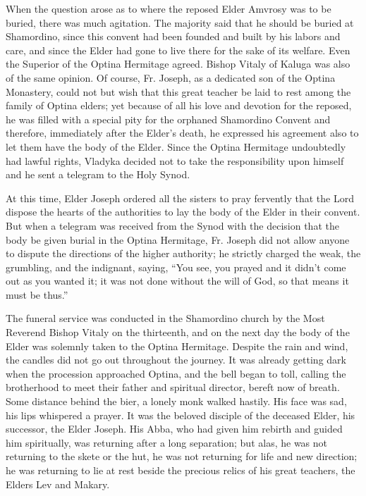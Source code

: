 When the question arose as to where the reposed Elder Amvrosy was to be buried, there was much agitation. The majority said that he should be buried at Shamordino, since this convent had been founded and built by his labors and care, and since the Elder had gone to live there for the sake of its welfare. Even the Superior of the Optina Hermitage agreed. Bishop Vitaly of Kaluga was also of the same opinion. Of course, Fr. Joseph, as a dedicated son of the Optina Monastery, could not but wish that this great teacher be laid to rest among the family of Optina elders; yet because of all his love and devotion for the reposed, he was filled with a special pity for the orphaned Shamordino Convent and therefore, immediately after the Elder's death, he expressed his agreement also to let them have the body of the Elder. Since the Optina Hermitage undoubtedly had lawful rights, Vladyka decided not to take the responsibility upon himself and he sent a telegram to the Holy Synod.

At this time, Elder Joseph ordered all the sisters to pray fervently that the Lord dispose the hearts of the authorities to lay the body of the Elder in their convent. But when a telegram was received from the Synod with the decision that the body be given burial in the Optina Hermitage, Fr. Joseph did not allow anyone to dispute the directions of the higher authority; he strictly charged the weak, the grumbling, and the indignant, saying, ``You see, you prayed and it didn't come out as you wanted it; it was not done without the will of God, so that means it must be thus.''

The funeral service was conducted in the Shamordino church by the Most Reverend Bishop Vitaly on the thirteenth, and on the next day the body of the Elder was solemnly taken to the Optina Hermitage. Despite the rain and wind, the candles did not go out throughout the journey. It was already getting dark when the procession approached Optina, and the bell began to toll, calling the brotherhood to meet their father and spiritual director, bereft now of breath. Some distance behind the bier, a lonely monk walked hastily. His face was sad, his lips whispered a prayer. It was the beloved disciple of the deceased Elder, his successor, the Elder Joseph. His Abba, who had given him rebirth and guided him spiritually, was returning after a long separation; but alas, he was not returning to the skete or the hut, he was not returning for life and new direction; he was returning to lie at rest beside the precious relics of his great teachers, the Elders Lev and Makary.

